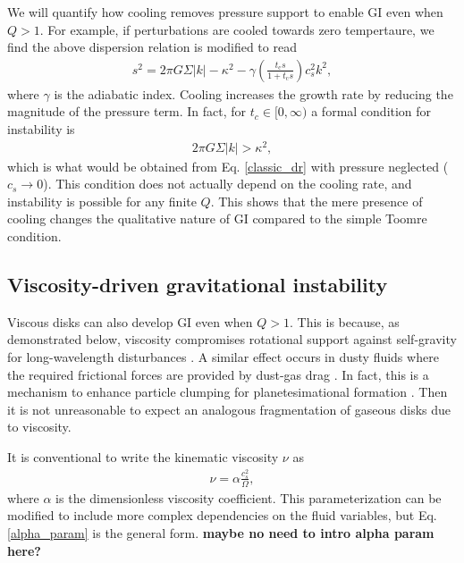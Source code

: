 \documentclass[iop, numberedappendix]{emulateapj}
\newcommand{\tcool}{t_\mathrm{c}}
\begin{document}
We will quantify how cooling removes pressure support to enable GI
even when $Q>1$. For example, if perturbations are
cooled towards zero tempertaure, we find the above dispersion relation is
modified to read 
\begin{align}\label{cool_dr}
s^2 = 2\pi G\Sigma |k| - \kappa^2 - \gamma \left(\frac{\tcool s}{1 +
  \tcool s}\right)c_s^2k^2,
\end{align}
where $\gamma$ is the adiabatic index. Cooling increases the growth
rate by reducing the magnitude of the 
pressure term. In fact, for $t_c\in[0,\infty)$ a formal condition
for instability is  
\begin{align*}
  2\pi G \Sigma |k| > \kappa^2,
\end{align*}
which is what would be obtained from Eq. \ref{classic_dr} with 
pressure neglected ($c_s\to 0$). This condition does not actually
depend on the cooling rate, and instability is
possible for any finite $Q$. %
This shows that the mere presence of
cooling changes the qualitative nature of GI compared to the simple
Toomre condition.   




\subsection{Viscosity-driven gravitational instability}\label{visc_gi}
Viscous disks can also develop GI even when $Q>1$. This is because, as 
demonstrated below, viscosity compromises rotational support against  
self-gravity for long-wavelength disturbances 
\citep{lynden-bell74,willerding92,gammie96}. A similar effect   
occurs in dusty fluids where the required frictional forces are 
provided by dust-gas drag \citep{ward00, takahashi14}. 
In fact, this
is a mechanism to enhance particle clumping for planetesimational
formation %
\citep{youdin11}. Then it is not unreasonable to expect an analogous
fragmentation of gaseous disks due to viscosity.   

It is conventional to write the kinematic viscosity $\nu$ as   
\begin{align}\label{alpha_param}
  \nu  = \alpha \frac{c_s^2}{\Omega}, %
\end{align}
where $\alpha$ is the dimensionless viscosity
coefficient. This
parameterization can be modified to include more complex dependencies on the
fluid variables, but Eq. \ref{alpha_param} is the general form. 
{\bf maybe no need to intro alpha param here?}
\end{document}
